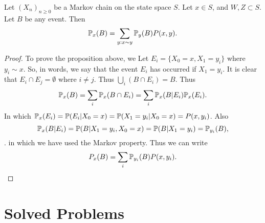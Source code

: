 \begin{proposition}
	Let $(X_n)_{n\geq 0}$ be a Markov chain on the state space $S$. Let $x\in S$, and $W,Z \subset S$. Let $B$ be any event. Then
	\[ \mathbb{P}_x(B) = \sum_{y:x\sim y} \mathbb{P}_y(B)P(x,y). \]
	\label{prop:FirstTimeStepArgument}
\end{proposition}
\begin{proof}
	To prove the proposition above, we Let $E_i = \{ X_0=x, X_1=y_i \}$ where $y_i \sim x$. So, in words, we say that the event $E_i$ has occurred if $X_1 = y_i$. It is clear that $E_i \cap E_j = \emptyset$ where $i\neq j$. Thus $\bigcup_{i}(B\cap E_i) = B$. Thus 
	\[ \mathbb{P}_x(B) = \sum_{i} \mathbb{P}_x(B \cap E_i) = \sum_{i}\mathbb{P}_x(B|E_i)\mathbb{P}_x(E_i). \]
	In which $\mathbb{P}_x(E_i) = \mathbb{P}(E_i|X_0=x) = \mathbb{P}(X_1=y_i|X_0=x) = P(x,y_i)  $. Also \[\mathbb{P}_x(B|E_i) = \mathbb{P}(B|X_1=y_i, X_0=x) = \mathbb{P}(B|X_1=y_i) = \mathbb{P}_{y_i}(B),\].
	in which we have used the Markov property. Thus we can write
	\[ P_x(B) = \sum_i \mathbb{P}_{y_i}(B)P(x,y_i). \]
\end{proof}





\section{Solved Problems}


